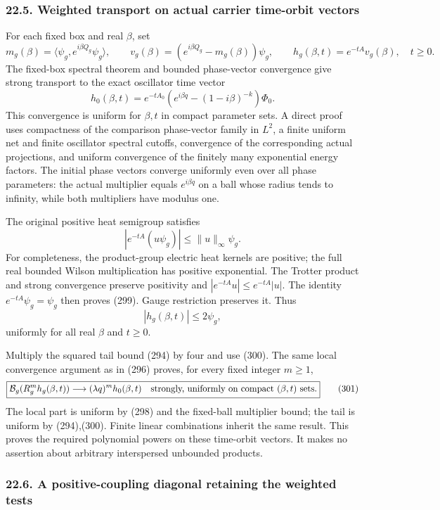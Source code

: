 \documentclass[
  11pt,
]{article}
\begin{document}
\subsubsection{22.5. Weighted transport on actual carrier time-orbit
vectors}\label{weighted-transport-on-actual-carrier-time-orbit-vectors}

For each fixed box and real \(\beta\), set \[
 m_g(\beta)=\langle\psi_g,e^{i\beta Q_g}\psi_g\rangle,\qquad
 v_g(\beta)=(e^{i\beta Q_g}-m_g(\beta))\psi_g,\qquad
 h_g(\beta,t)=e^{-tA}v_g(\beta),\quad t\ge0.
\] The fixed-box spectral theorem and bounded phase-vector convergence
give strong transport to the exact oscillator time vector \[
 h_0(\beta,t)=e^{-tA_0}
       (e^{i\beta q}-(1-i\beta)^{-k})\Phi_0.
 \tag{298}
\] This convergence is uniform for \(\beta,t\) in compact parameter
sets. A direct proof uses compactness of the comparison phase-vector
family in \(L^2\), a finite uniform net and finite oscillator spectral
cutoffs, convergence of the corresponding actual projections, and
uniform convergence of the finitely many exponential energy factors. The
initial phase vectors converge uniformly even over all phase parameters:
the actual multiplier equals \(e^{i\beta q}\) on a ball whose radius
tends to infinity, while both multipliers have modulus one.

The original positive heat semigroup satisfies \[
 |e^{-tA}(u\psi_g)|\le\|u\|_\infty\psi_g.
 \tag{299}
\] For completeness, the product-group electric heat kernels are
positive; the full real bounded Wilson multiplication has positive
exponential. The Trotter product and strong convergence preserve
positivity and \(|e^{-tA}u|\le e^{-tA}|u|\). The identity
\(e^{-tA}\psi_g=\psi_g\) then proves (299). Gauge restriction preserves
it. Thus \[
 |h_g(\beta,t)|\le2\psi_g,
 \tag{300}
\] uniformly for all real \(\beta\) and \(t\ge0\).

Multiply the squared tail bound (294) by four and use (300). The same
local convergence argument as in (296) proves, for every fixed integer
\(m\ge1\), \[
 \boxed{\mathcal B_g(R_g^m h_g(\beta,t))
       \longrightarrow(\lambda q)^m h_0(\beta,t)
       \quad\hbox{strongly, uniformly on compact }(\beta,t)\hbox{ sets}.}
 \tag{301}
\] The local part is uniform by (298) and the fixed-ball multiplier
bound; the tail is uniform by (294),(300). Finite linear combinations
inherit the same result. This proves the required polynomial powers on
these time-orbit vectors. It makes no assertion about arbitrary
interspersed unbounded products.

\subsubsection{22.6. A positive-coupling diagonal retaining the weighted
tests}\label{a-positive-coupling-diagonal-retaining-the-weighted-tests}
\end{document}
